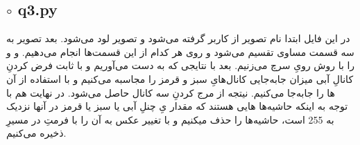 \documentclass[a4paper,12pt]{article}
\begin{document}
\subsection*{$\circ$ q3.py}
در این فایل ابتدا نام تصویر از کاربر گرفته می‌شود و تصویر لود می‌شود. بعد تصویر به سه قسمت مساوی تقسیم می‌شود و روی هر کدام از این قسمت‌ها
انجام می‌دهیم.
و
و 
را با روش 
رویِ
 سرچ می‌زنیم. بعد با نتایجی که به دست می‌آوریم و با ثابت فرض کردنِ کانالِ آبی میزان جابه‌جایی کانال‌هایِ سبز و قرمز را مجاسبه می‌کنیم و با استفاده از 
 آن ها را جابه‌جا می‌کنیم. نیتجه از مرج کردنِ سه کانال حاصل می‌شود. در نهایت هم با توجه به اینکه حاشیه‌ها 
 هایی هستند که مقدار 
 یِ چنلِ آبی یا سبز یا قرمز در آنها نزدیک به 255 است، حاشیه‌ها را حذف میکنیم و با تغییر عکس به 
 آن را با فرمتِ 
 در مسیرِ
 ذخیره می‌کنیم.
 
  
\end{document}
